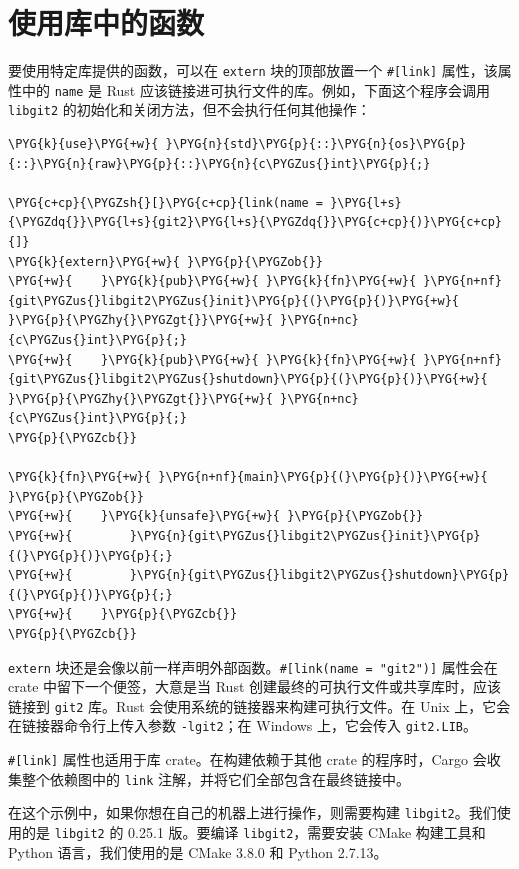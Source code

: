 \section{使用库中的函数}

要使用特定库提供的函数，可以在 \texttt{extern} 块的顶部放置一个 \texttt{\#[link]} 属性，该属性中的 \texttt{name} 是 Rust 应该链接进可执行文件的库。例如，下面这个程序会调用 \texttt{libgit2} 的初始化和关闭方法，但不会执行任何其他操作：

\begin{Verbatim}[commandchars=\\\{\},breaklines=true,breakanywhere=true,fontsize=\codefont,xleftmargin=17bp]
\PYG{k}{use}\PYG{+w}{ }\PYG{n}{std}\PYG{p}{::}\PYG{n}{os}\PYG{p}{::}\PYG{n}{raw}\PYG{p}{::}\PYG{n}{c\PYGZus{}int}\PYG{p}{;}

\PYG{c+cp}{\PYGZsh{}[}\PYG{c+cp}{link(name = }\PYG{l+s}{\PYGZdq{}}\PYG{l+s}{git2}\PYG{l+s}{\PYGZdq{}}\PYG{c+cp}{)}\PYG{c+cp}{]}
\PYG{k}{extern}\PYG{+w}{ }\PYG{p}{\PYGZob{}}
\PYG{+w}{    }\PYG{k}{pub}\PYG{+w}{ }\PYG{k}{fn}\PYG{+w}{ }\PYG{n+nf}{git\PYGZus{}libgit2\PYGZus{}init}\PYG{p}{(}\PYG{p}{)}\PYG{+w}{ }\PYG{p}{\PYGZhy{}\PYGZgt{}}\PYG{+w}{ }\PYG{n+nc}{c\PYGZus{}int}\PYG{p}{;}
\PYG{+w}{    }\PYG{k}{pub}\PYG{+w}{ }\PYG{k}{fn}\PYG{+w}{ }\PYG{n+nf}{git\PYGZus{}libgit2\PYGZus{}shutdown}\PYG{p}{(}\PYG{p}{)}\PYG{+w}{ }\PYG{p}{\PYGZhy{}\PYGZgt{}}\PYG{+w}{ }\PYG{n+nc}{c\PYGZus{}int}\PYG{p}{;}
\PYG{p}{\PYGZcb{}}

\PYG{k}{fn}\PYG{+w}{ }\PYG{n+nf}{main}\PYG{p}{(}\PYG{p}{)}\PYG{+w}{ }\PYG{p}{\PYGZob{}}
\PYG{+w}{    }\PYG{k}{unsafe}\PYG{+w}{ }\PYG{p}{\PYGZob{}}
\PYG{+w}{        }\PYG{n}{git\PYGZus{}libgit2\PYGZus{}init}\PYG{p}{(}\PYG{p}{)}\PYG{p}{;}
\PYG{+w}{        }\PYG{n}{git\PYGZus{}libgit2\PYGZus{}shutdown}\PYG{p}{(}\PYG{p}{)}\PYG{p}{;}
\PYG{+w}{    }\PYG{p}{\PYGZcb{}}
\PYG{p}{\PYGZcb{}}
\end{Verbatim}

\texttt{extern} 块还是会像以前一样声明外部函数。\texttt{\#[link(name = "git2")]} 属性会在 crate 中留下一个便签，大意是当 Rust 创建最终的可执行文件或共享库时，应该链接到 \texttt{git2} 库。Rust 会使用系统的链接器来构建可执行文件。在 Unix 上，它会在链接器命令行上传入参数 \texttt{-lgit2}；在 Windows 上，它会传入 \texttt{git2.LIB}。

\texttt{\#[link]} 属性也适用于库 crate。在构建依赖于其他 crate 的程序时，Cargo 会收集整个依赖图中的 \texttt{link} 注解，并将它们全部包含在最终链接中。

在这个示例中，如果你想在自己的机器上进行操作，则需要构建 \texttt{libgit2}。我们使用的是 \texttt{libgit2} 的 0.25.1 版。要编译 \texttt{libgit2}，需要安装 CMake 构建工具和 Python 语言，我们使用的是 CMake 3.8.0 和 Python 2.7.13。

